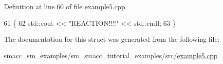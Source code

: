 Definition at line 60 of file example5.\+cpp.


\begin{DoxyCode}
61     \{
62         std::cout << \textcolor{stringliteral}{"REACTION!!!!"} << std::endl;
63     \}
\end{DoxyCode}


The documentation for this struct was generated from the following file\+:\begin{DoxyCompactItemize}
\item 
smacc\+\_\+sm\+\_\+examples/sm\+\_\+smacc\+\_\+tutorial\+\_\+examples/src/\hyperlink{example5_8cpp}{example5.\+cpp}\end{DoxyCompactItemize}
